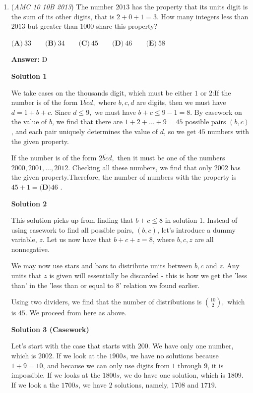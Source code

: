 \begin{enumerate}
 


	\item (\textit{AMC 10 10B 2013}) The number $2013$ has the property that its units digit is the sum of its other digits, that is $2+0+1=3$. How many integers less than $2013$ but greater than $1000$ share this property?


 $\textbf{(A)}\ 33\qquad\textbf{(B)}\ 34\qquad\textbf{(C)}\ 45\qquad\textbf{(D)}\ 46\qquad\textbf{(E)}\ 58$

 \textbf{Answer: }D



\textbf{Solution 1}

We take cases on the thousands digit, which must be either $1$ or $2$:If the number is of the form $\overline{1bcd},$ where $b, c, d$ are digits, then we must have $d = 1 + b + c.$ Since $d \le 9,$ we must have $b + c \le 9 - 1 = 8.$ By casework on the value of $b$, we find that there are $1 + 2 + \dots + 9 = 45$ possible pairs $(b, c)$, and each pair uniquely determines the value of $d$, so we get $45$ numbers with the given property.

 If the number is of the form $\overline{2bcd},$ then it must be one of the numbers $2000, 2001, \dots, 2012.$ Checking all these numbers, we find that only $2002$ has the given property.Therefore, the number of numbers with the property is $45 + 1 = \boxed{\textbf{(D)}46}$ .

 



\textbf{Solution 2}

This solution picks up from finding that $b + c \le 8$ in solution 1. Instead of using casework to find all possible pairs, $(b, c)$, let's introduce a dummy variable, $z$. Let us now have that $b + c + z = 8$, where $b, c, z$ are all nonnegative. 

 We may now use stars and bars to distribute units between $b, c$ and $z$. Any units that $z$ is given will essentially be discarded - this is how we get the 'less than' in the 'less than or equal to $8$' relation we found earlier.

 Using two dividers, we find that the number of distributions is $\binom{10}{2},$ which is $45$. We proceed from here as above.

 



\textbf{Solution 3 (Casework)}

Let's start with the case that starts with $200$. We have only one number, which is $2002$. If we look at the $1900s$, we have no solutions because $1+9 = 10$, and because we can only use digits from $1$ through $9$, it is impossible. If we looks at the $1800s$, we do have one solution, which is $1809$. If we look a the $1700s$, we have $2$ solutions, namely, $1708$ and $1719$. 


\end{enumerate}
